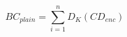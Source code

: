 \begin{equation}
    BC_{plain} = \sum_{i=1}^{n} D_K(CD_{enc})
    \label{eq:fhe_bc_decrypt}
\end{equation}